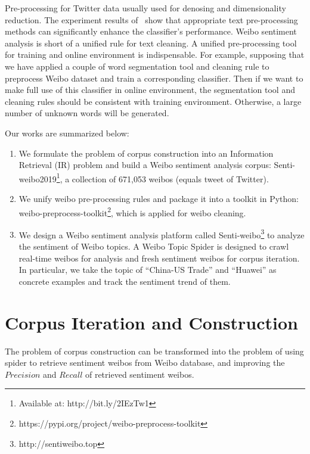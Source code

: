 \documentclass[runningheads]{llncs}
\begin{document}
Pre-processing for Twitter data usually used for denosing and dimensionality reduction. The experiment results of~\cite{haddi2013role} show that appropriate text pre-processing methods can significantly enhance the classifier's performance. Weibo sentiment analysis is short of a unified rule for text cleaning. A unified pre-processing tool for training and online environment is indispensable. For example, supposing that we have applied a couple of word segmentation tool and cleaning rule to preprocess Weibo dataset and train a corresponding classifier. Then if we want to make full use of this classifier in online environment, the segmentation tool and cleaning rules should be consistent with training environment. Otherwise, a large number of unknown words will be generated.

Our works are summarized below:
\begin{enumerate}
\item We formulate the problem of corpus construction into an Information Retrieval (IR) problem and build a Weibo sentiment analysis corpus: Senti-weibo2019\footnote{Available at: http://bit.ly/2IEzTw1}, a collection of 671,053 weibos (equals tweet of Twitter).

\item We unify weibo pre-processing rules and package it into a toolkit in Python: weibo-preprocess-toolkit\footnote{https://pypi.org/project/weibo-preprocess-toolkit}, which is applied for weibo cleaning. 

\item We design a Weibo sentiment analysis platform called Senti-weibo\footnote{http://sentiweibo.top} to analyze the sentiment of Weibo topics. A Weibo Topic Spider is designed to crawl real-time weibos for analysis and fresh sentiment weibos for corpus iteration. In particular, we take the topic of ``China-US Trade'' and ``Huawei'' as concrete examples and track the sentiment trend of them.
\end{enumerate}


\section{Corpus Iteration and Construction}
The problem of corpus construction can be transformed into the problem of using spider to retrieve sentiment weibos from Weibo database, and improving the $Precision$ and $Recall$ of retrieved sentiment weibos. 
\end{document}
